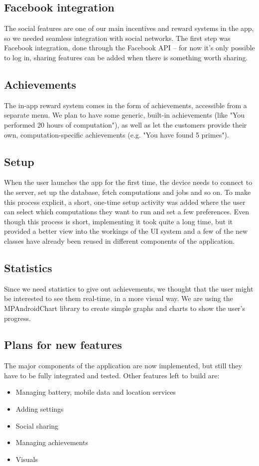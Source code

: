 \documentclass[a4paper,10pt]{article}
\begin{document}
\subsection{Facebook integration} The social features are one of our main incentives and reward systems in the app, so we needed seamless integration with social networks. The first step was Facebook integration, done through the Facebook API -- for now it's only possible to log in, sharing features can be added when there is something worth sharing.
\subsection{Achievements} The in-app reward system comes in the form of achievements, accessible from a separate menu. We plan to have some generic, built-in achievements (like "You performed 20 hours of computation"), as well as let the customers provide their own, computation-specific achievements (e.g. "You have found 5 primes").
\subsection{Setup}When the user launches the app for the first time, the device needs to connect to the server, set up the database, fetch computations and jobs and so on. To make this process explicit, a short, one-time setup activity was added where the user can select which computations they want to run and set a few preferences. Even though this process is short, implementing it took quite a long time, but it provided a better view into the workings of the UI system and a few of the new classes have already been reused in different components of the application.
\subsection{Statistics}Since we need statistics to give out achievements, we thought that the user might be interested to see them real-time, in a more visual way. We are using the MPAndroidChart library to create simple graphs and charts to show the user's progress.


\subsection{Plans for new features}

The major components of the application are now implemented, but still they have to be fully integrated and tested. Other features left to build are:

\begin{itemize}
    \item Managing battery, mobile data and location services
    \item Adding settings
    \item Social sharing
    \item Managing achievements
    \item Visuals
\end{itemize}
\end{document}
